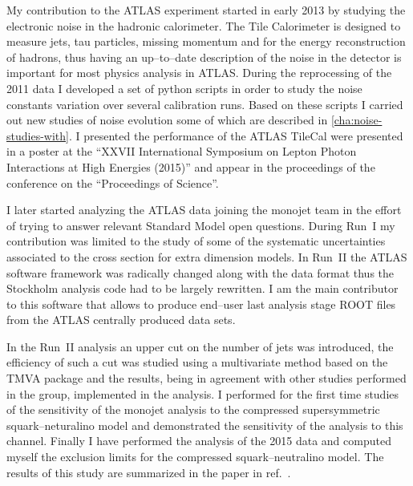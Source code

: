 My contribution to the ATLAS experiment started in early 2013 by studying the
electronic noise in the hadronic calorimeter. The Tile Calorimeter is designed
to measure jets, tau particles, missing momentum and for the energy
reconstruction of hadrons, thus having an up--to--date description of the noise
in the detector is important for most physics analysis in ATLAS\@. During the
reprocessing of the 2011 data I developed a set of python scripts in order to
study the noise constants variation over several calibration runs. Based on
these scripts I carried out new studies of noise evolution some of which are
described in \cref{cha:noise-studies-with}. I presented the performance of the
ATLAS TileCal were presented in a poster at the ``XXVII International Symposium
on Lepton Photon Interactions at High Energies (2015)'' and appear in the
proceedings of the conference on the ``Proceedings of Science''.

I later started analyzing the ATLAS data joining the monojet team in the effort
of trying to answer relevant Standard Model open questions. During Run~I my
contribution was limited to the study of some of the systematic uncertainties
associated to the cross section for extra dimension models. In Run~II the ATLAS
software framework was radically changed along with the data format thus the
Stockholm analysis code had to be largely rewritten. I am the main contributor
to this software that allows to produce end--user last analysis stage ROOT files
from the ATLAS centrally produced data sets.

In the Run~II analysis an upper cut on the number of jets was introduced, the
efficiency of such a cut was studied using a multivariate method based on the
TMVA package and the results, being in agreement with other studies performed in
the group, implemented in the analysis. I performed for the first time studies
of the sensitivity of the monojet analysis to the compressed supersymmetric
squark--neturalino model and demonstrated the sensitivity of the analysis to
this channel. Finally I have performed the analysis of the 2015 data and
computed myself the exclusion limits for the compressed squark--neutralino
model. The results of this study are summarized in the paper in
ref.~\cite{MonoJetPaper}.
